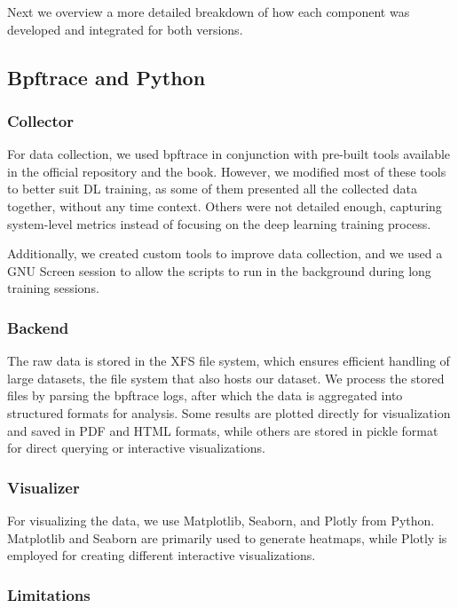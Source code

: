 \documentclass[conference]{IEEEtran}
\begin{document}
Next we overview a more detailed breakdown of how each component was developed and integrated for both versions.

\subsection{Bpftrace and Python}

\subsubsection{Collector}

For data collection, we used bpftrace\cite{bpftrace} in conjunction with pre-built tools available in the official repository and the book\cite{bgreggBook}.
However, we modified most of these tools to better suit DL training, as some of them presented all the collected data together, without any time context.
Others were not detailed enough, capturing system-level metrics instead of focusing on the deep learning training process.

Additionally, we created custom tools to improve data collection, and we used a GNU Screen \cite{screen} session to allow the scripts to run in the background during long training sessions.

\subsubsection{Backend}

The raw data is stored in the XFS file system, which ensures efficient handling of large datasets, the file system that also hosts our dataset.
We process the stored files by parsing the bpftrace logs, after which the data is aggregated into structured formats for analysis.
Some results are plotted directly for visualization and saved in PDF and HTML formats, while others are stored in pickle format for direct querying or interactive visualizations.

\subsubsection{Visualizer}

For visualizing the data, we use Matplotlib, Seaborn, and Plotly from Python.
Matplotlib and Seaborn are primarily used to generate heatmaps, while Plotly is employed for creating different interactive visualizations.

\subsubsection{Limitations}
\end{document}
